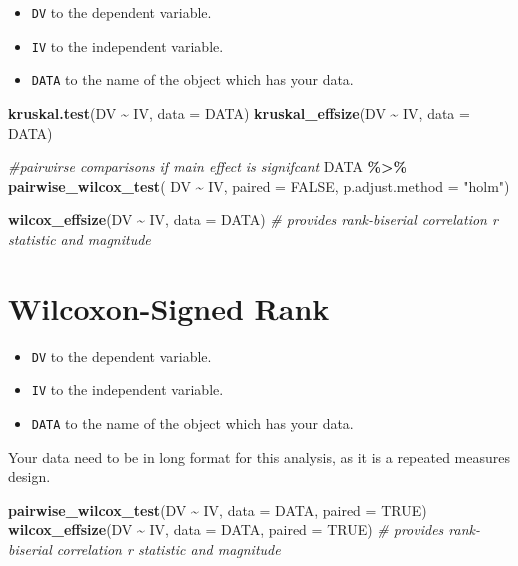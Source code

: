 \documentclass[
]{book}
\newenvironment{Shaded}{\begin{snugshade}}{\end{snugshade}}
\newcommand{\AttributeTok}[1]{\textcolor[rgb]{0.13,0.29,0.53}{#1}}
\newcommand{\CommentTok}[1]{\textcolor[rgb]{0.56,0.35,0.01}{\textit{#1}}}
\newcommand{\ConstantTok}[1]{\textcolor[rgb]{0.56,0.35,0.01}{#1}}
\newcommand{\FunctionTok}[1]{\textcolor[rgb]{0.13,0.29,0.53}{\textbf{#1}}}
\newcommand{\NormalTok}[1]{#1}
\newcommand{\SpecialCharTok}[1]{\textcolor[rgb]{0.81,0.36,0.00}{\textbf{#1}}}
\newcommand{\StringTok}[1]{\textcolor[rgb]{0.31,0.60,0.02}{#1}}
\providecommand{\tightlist}{%
  \setlength{\itemsep}{0pt}\setlength{\parskip}{0pt}}
\let\oldsection\section
\renewcommand{\section}{\needspace{5\baselineskip}\oldsection}
\begin{document}
\begin{itemize}
\tightlist
\item
  \texttt{DV} to the dependent variable.
\item
  \texttt{IV} to the independent variable.
\item
  \texttt{DATA} to the name of the object which has your data.
\end{itemize}

\begin{Shaded}
\begin{Highlighting}[]
\FunctionTok{kruskal.test}\NormalTok{(DV }\SpecialCharTok{\textasciitilde{}}\NormalTok{ IV, }\AttributeTok{data =}\NormalTok{ DATA)}
\FunctionTok{kruskal\_effsize}\NormalTok{(DV }\SpecialCharTok{\textasciitilde{}}\NormalTok{ IV, }\AttributeTok{data =}\NormalTok{ DATA)}

\CommentTok{\#pairwirse comparisons if main effect is signifcant}
\NormalTok{DATA }\SpecialCharTok{\%\textgreater{}\%}
  \FunctionTok{pairwise\_wilcox\_test}\NormalTok{(}
\NormalTok{    DV }\SpecialCharTok{\textasciitilde{}}\NormalTok{ IV,}
    \AttributeTok{paired =} \ConstantTok{FALSE}\NormalTok{,}
    \AttributeTok{p.adjust.method =} \StringTok{"holm"}\NormalTok{)}
    
\FunctionTok{wilcox\_effsize}\NormalTok{(DV }\SpecialCharTok{\textasciitilde{}}\NormalTok{ IV, }\AttributeTok{data =}\NormalTok{ DATA) }\CommentTok{\# provides rank{-}biserial correlation r statistic and magnitude}
\end{Highlighting}
\end{Shaded}

\section{Wilcoxon-Signed Rank}\label{wilcoxon-signed-rank}

\begin{itemize}
\tightlist
\item
  \texttt{DV} to the dependent variable.
\item
  \texttt{IV} to the independent variable.
\item
  \texttt{DATA} to the name of the object which has your data.
\end{itemize}

Your data need to be in long format for this analysis, as it is a repeated measures design.

\begin{Shaded}
\begin{Highlighting}[]
\FunctionTok{pairwise\_wilcox\_test}\NormalTok{(DV }\SpecialCharTok{\textasciitilde{}}\NormalTok{ IV, }\AttributeTok{data =}\NormalTok{ DATA, }\AttributeTok{paired =} \ConstantTok{TRUE}\NormalTok{)}
\FunctionTok{wilcox\_effsize}\NormalTok{(DV }\SpecialCharTok{\textasciitilde{}}\NormalTok{ IV, }\AttributeTok{data =}\NormalTok{ DATA, }\AttributeTok{paired =} \ConstantTok{TRUE}\NormalTok{) }\CommentTok{\# provides rank{-}biserial correlation r statistic and magnitude}
\end{Highlighting}
\end{Shaded}
\end{document}
